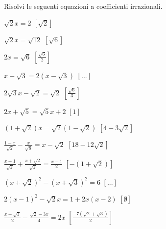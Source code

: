 \begin{esercizio}[\Ast]
 \label{ese:2.80}
Risolvi le seguenti equazioni a coefficienti irrazionali.
 \begin{multicols}{2}
 \begin{enumeratea}
 \item \(\sqrt 2x=2\)
  \hfill \(\left[\sqrt 2 \right]\)
 \item \(\sqrt 2x=\sqrt{12}\)
  \hfill \(\left[\sqrt 6\right]\)
 \item \(2x=\sqrt 6\)
  \hfill \(\left[\frac{\sqrt{6}}{2}\right]\)
 \item \(x-\sqrt 3=2\left(x-\sqrt 3\right)\)
  \hfill \(\left[...\right]\)
 \item \(2\sqrt 3x-\sqrt 2=\sqrt 2\)
  \hfill \(\left[\frac{\sqrt 6} 3\right]\)
 \item \(2x+\sqrt 5=\sqrt 5x+2\)
  \hfill \(\left[1\right]\)
 \item \((1+\sqrt 2)x=\sqrt 2(1-\sqrt 2)\)
  \hfill \(\left[4-3\sqrt 2\right]\)
 \item \(\frac{1-x}{\sqrt 2}-\frac x{\sqrt 8}=x-\sqrt 2\)
  \hfill \(\left[18-12\sqrt 2\right]\)
 \item \(\frac{x+1}{\sqrt 2}+\frac{x+\sqrt 2}{\sqrt 2}=\frac{x-1} 2\)
  \hfill \(\left[-(1+\sqrt 2)\right]\)
 \item \((x+\sqrt 2)^2-(x+\sqrt 3)^2=6\)
  \hfill \(\left[...\right]\)
 \item \(2(x-1)^2-\sqrt 2x=1+2x(x-2)\)
  \hfill \(\left[\emptyset\right]\)
 \item \(\frac{x-\sqrt 3} 2-\frac{\sqrt 2-3x} 4=2x\)
  \hfill \(\left[\frac{-7(\sqrt 2+\sqrt 3)} 2\right]\)
 \end{enumeratea}
 \end{multicols}
\end{esercizio}


